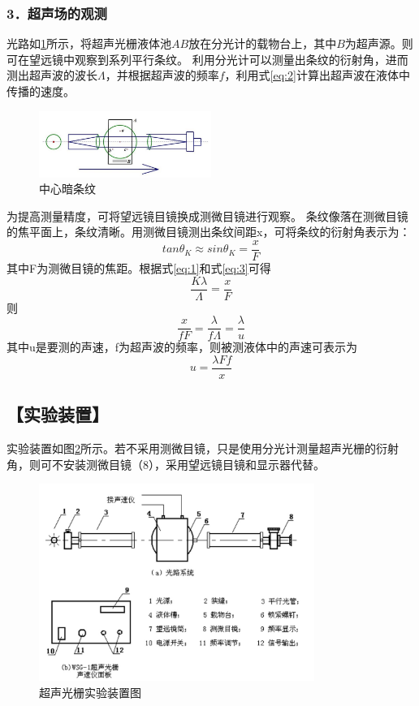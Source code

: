 \documentclass[12pt,a4paper,UTF8]{ctexart}
\begin{document}
\subsubsection*{3．超声场的观测}
	光路如\ref{fig:illus-4}所示，将超声光栅液体池$AB$放在分光计的载物台上，其中$B$为超声源。则可在望远镜中观察到系列平行条纹。
	利用分光计可以测量出条纹的衍射角，进而测出超声波的波长$\Lambda $，并根据超声波的频率$f$，利用式\ref{eq:2}计算出超声波在液体中传播的速度。
	\begin{figure}[htbp]
		\centering
		\includegraphics[width=0.5\textwidth]{attachments/illus-4.jpg}
		\caption{中心暗条纹}
		\label{fig:illus-4}
	\end{figure}

	为提高测量精度，可将望远镜目镜换成测微目镜进行观察。
	条纹像落在测微目镜的焦平面上，条纹清晰。用测微目镜测出条纹间距x，可将条纹的衍射角表示为：
	\begin{equation}\label{eq:3}
		tan \theta_K\approx sin\theta_K=\frac{x}{F}
	\end{equation}
	其中F为测微目镜的焦距。根据式\ref{eq:1}和式\ref{eq:3}可得
	\begin{equation}
		\frac{K\lambda}{\varLambda }=\frac{x}{F}
	\end{equation}
	则
	\begin{equation}
		\frac{x}{fF}=\frac{\lambda}{f\varLambda}=\frac{\lambda}{u}
	\end{equation}
	其中u是要测的声速，f为超声波的频率，则被测液体中的声速可表示为
	\begin{equation}\label{eq:4}
		u=\frac{\lambda F f}{x}
	\end{equation}
 
\subsection*{【实验装置】}
实验装置如图\ref{fig:5}所示。若不采用测微目镜，只是使用分光计测量超声光栅的衍射角，则可不安装测微目镜（8），采用望远镜目镜和显示器代替。
\begin{figure}[htbp]
	\centering
	\includegraphics[width=0.8\textwidth]{attachments//illus-5.jpg}
	\caption{超声光栅实验装置图}
	\label{fig:5}
\end{figure}
\end{document}
